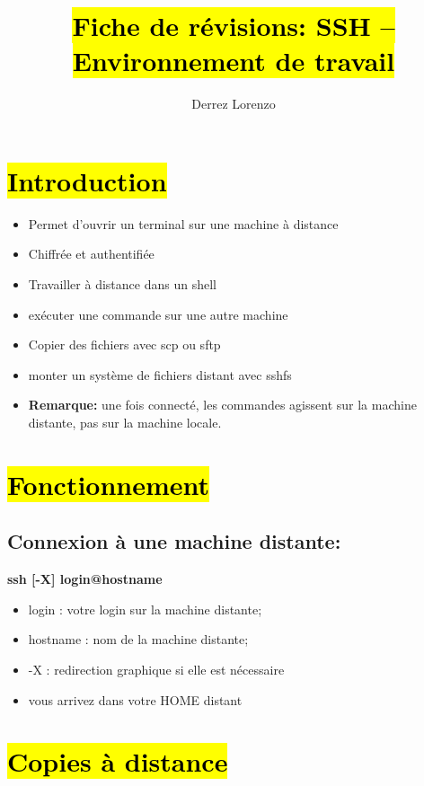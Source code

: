 \documentclass{article}
\title{\sethlcolor{purple!30}\hl{\textbf{Fiche de révisions: SSH -- Environnement de travail}}}
\author{Derrez Lorenzo}
\begin{document}
\maketitle

\section*{\hl{\textbf{Introduction}}}

\begin{itemize}
    \item Permet d'ouvrir un terminal sur une machine à distance
    \item Chiffrée et authentifiée
    \item Travailler à distance dans un shell 
    \item exécuter une commande sur une autre machine 
    \item Copier des fichiers avec scp ou sftp 
    \item monter un système de fichiers distant avec sshfs
    \item \textbf{Remarque:} une fois connecté, les commandes agissent sur la machine distante, pas sur la machine locale.
\end{itemize}

\section*{\hl{\textbf{Fonctionnement}}}

\subsection*{\textbf{Connexion à une machine distante:}}

\textbf{ssh [-X] login@hostname}

\begin{itemize}
    \item login : votre login sur la machine distante; 
    \item hostname : nom de la machine distante; 
    \item -X : redirection graphique si elle est nécessaire 
    \item vous arrivez dans votre HOME distant
\end{itemize}

\section*{\hl{\textbf{Copies à distance}}}
\end{document}
